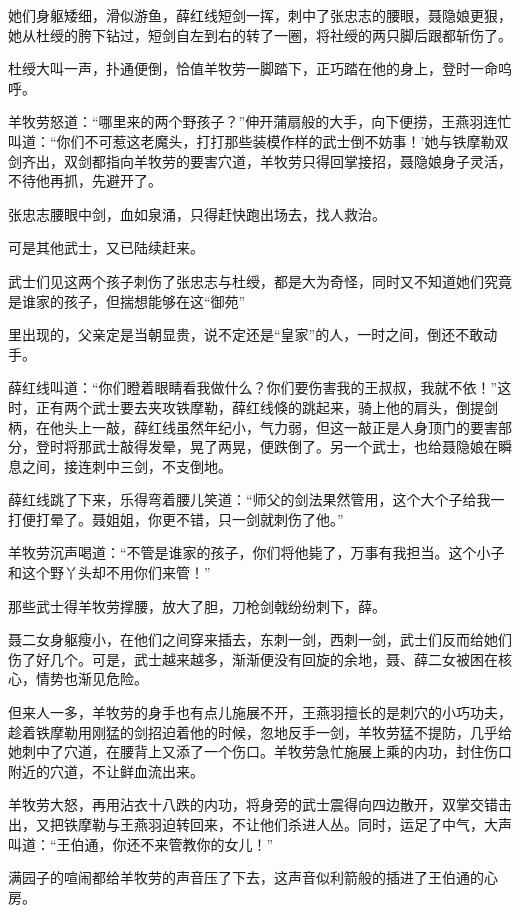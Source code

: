 \documentclass[12pt,oneside]{book}
\begin{document}
她们身躯矮细，滑似游鱼，薛红线短剑一挥，刺中了张忠志的腰眼，聂隐娘更狠，她从杜绶的胯下钻过，短剑自左到右的转了一圈，将社绶的两只脚后跟都斩伤了。

杜绶大叫一声，扑通便倒，恰值羊牧劳一脚踏下，正巧踏在他的身上，登时一命呜呼。

羊牧劳怒道：``哪里来的两个野孩子？''伸开蒲扇般的大手，向下便捞，王燕羽连忙叫道：``你们不可惹这老魔头，打打那些装模作样的武士倒不妨事！'她与铁摩勒双剑齐出，双剑都指向羊牧劳的要害穴道，羊牧劳只得回掌接招，聂隐娘身子灵活，不待他再抓，先避开了。

张忠志腰眼中剑，血如泉涌，只得赶快跑出场去，找人救治。

可是其他武士，又已陆续赶来。

武士们见这两个孩子刺伤了张忠志与杜绶，都是大为奇怪，同时又不知道她们究竟是谁家的孩子，但揣想能够在这``御苑''

里出现的，父亲定是当朝显贵，说不定还是``皇家''的人，一时之间，倒还不敢动手。

薛红线叫道：``你们瞪着眼睛看我做什么？你们要伤害我的王叔叔，我就不依！''这时，正有两个武士要去夹攻铁摩勒，薛红线倏的跳起来，骑上他的肩头，倒提剑柄，在他头上一敲，薛红线虽然年纪小，气力弱，但这一敲正是人身顶门的要害部分，登时将那武士敲得发晕，晃了两晃，便跌倒了。另一个武士，也给聂隐娘在瞬息之间，接连刺中三剑，不支倒地。

薛红线跳了下来，乐得弯着腰儿笑道：``师父的剑法果然管用，这个大个子给我一打便打晕了。聂姐姐，你更不错，只一剑就刺伤了他。''

羊牧劳沉声喝道：``不管是谁家的孩子，你们将他毙了，万事有我担当。这个小子和这个野丫头却不用你们来管！''

那些武士得羊牧劳撑腰，放大了胆，刀枪剑戟纷纷刺下，薛。

聂二女身躯瘦小，在他们之间穿来插去，东刺一剑，西刺一剑，武士们反而给她们伤了好几个。可是，武士越来越多，渐渐便没有回旋的余地，聂、薛二女被困在核心，情势也渐见危险。

但来人一多，羊牧劳的身手也有点儿施展不开，王燕羽擅长的是刺穴的小巧功夫，趁着铁摩勒用刚猛的剑招迫着他的时候，忽地反手一剑，羊牧劳猛不提防，几乎给她刺中了穴道，在腰背上又添了一个伤口。羊牧劳急忙施展上乘的内功，封住伤口附近的穴道，不让鲜血流出来。

羊牧劳大怒，再用沾衣十八跌的内功，将身旁的武士震得向四边散开，双掌交错击出，又把铁摩勒与王燕羽迫转回来，不让他们杀进人丛。同时，运足了中气，大声叫道：``王伯通，你还不来管教你的女儿！''

满园子的喧闹都给羊牧劳的声音压了下去，这声音似利箭般的插进了王伯通的心房。
\end{document}
